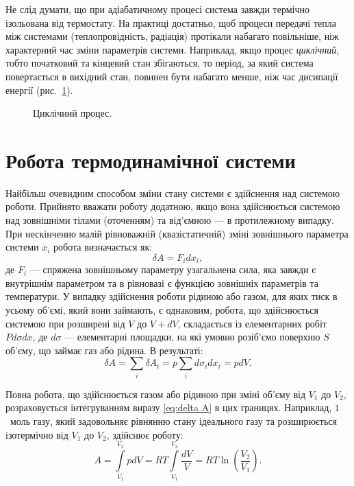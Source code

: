 Не слід думати, що при адіабатичному процесі система завжди термічно ізольована від термостату. На
практиці достатньо, щоб процеси передачі тепла між системами (теплопровідність, радіація) протікали
набагато повільніше, ніж характерний час зміни параметрів системи. Наприклад, якщо процес
\emph{циклічний}, тобто початковий та кінцевий стан збігаються, то період, за який система
повертається
в вихідний стан, повинен бути набагато менше, ніж час дисипації енергії (рис.~\ref{tikz:cyclic}).

\begin{figure}[h!]\centering
	
	\caption{Циклічний процес.}
	\label{tikz:cyclic}
\end{figure}

\section{Робота термодинамічної системи}

Найбільш очевидним способом зміни стану системи є здійснення над системою роботи. Прийнято вважати
роботу додатною, якщо вона здійснюється системою над зовнішніми тілами (оточенням) та від'ємною
--- в
протилежному випадку. При нескінченно малій рівноважній (квазістатичній) зміні зовнішнього параметра
системи $x_i$ робота визначається як:
\begin{equation*}
	\delta A = F_i dx_i,
\end{equation*}
де $F_i$ --- спряжена зовнішньому параметру узагальнена сила, яка завжди є внутрішнім параметром та в
рівновазі є функцією зовнішніх параметрів та температури. У випадку здійснення роботи рідиною або
газом, для яких тиск в усьому об'ємі, який вони займають, є однаковим, робота, що здійснюється
системою
при розширені від $V$ до $V+dV$, складається із елементарних робіт $Pd\sigma dx$, де $d\sigma$ ---
елементарні площадки, на які умовно розіб'ємо поверхню $S$ об'єму, що займає газ або рідина. В
результаті:
\begin{equation}\label{eq:delta A}
	\delta A = \sum\limits_i\delta A_i = p \sum\limits_i d\sigma_i dx_i = p dV.
\end{equation}

Повна робота, що здійснюється газом або рідиною при зміні об’єму від $V_1$ до $V_2$, розраховується
інтегруванням виразу \eqref{eq:delta A} в цих границях. Наприклад, $1$~моль газу, який задовольняє
рівнянню стану ідеального газу та розширюється ізотермічно від $V_1$ до $V_2$, здійснює роботу:
\begin{equation*}\label{eq:2a}
	A = \int\limits_{V_1}^{V_2} p dV = RT  \int\limits_{V_1}^{V_2} \frac{dV}{V} = RT
	\ln\left(\frac{V_2}{V_1}\right).
\end{equation*}

